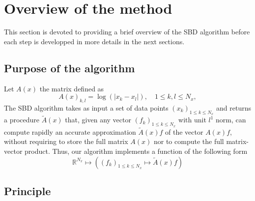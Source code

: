 \documentclass[11pt,a4paper]{article}
\begin{document}
\section{Overview of the method}
\label{sec:Overview}

This section is devoted to providing a brief overview of the SBD algorithm before each step is developped in more details in the next sections. 

\subsection{Purpose of the algorithm}

Let $A(x)$ the matrix defined as 
\[A(x)_{k,l} = \log(|x_k - x_l|), \quad 1 \leq k,l \leq N_x,\]
The SBD algorithm takes as input a set of data points $(x_k)_{1 \leq k \leq N_x}$ and returns a procedure $\tilde{A}(x)$ that, given any vector $(f_k)_{1 \leq k \leq N_x}$ with unit $l^{1}$ norm, can compute rapidly an accurate approximation $\tilde{A}(x)f$ of the vector  $A(x)f$, without requiring to store the full matrix $A(x)$ nor to compute the full matrix-vector product. Thus, our algorithm implements a function of the following form
\[ \mathbb{R}^{N_x}  \mapsto \left( (f_k)_{1 \leq k \leq N_x} \mapsto \tilde{A}(x) f \right)\]

\subsection{Principle}
\end{document}
